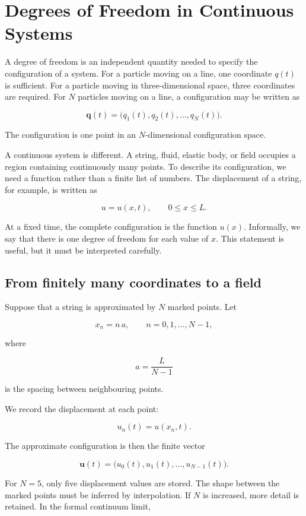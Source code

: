 \section{Degrees of Freedom in Continuous Systems}
\label{sec:continuous_degrees_of_freedom}

A degree of freedom is an independent quantity needed to specify the configuration of a system. For a particle moving on a line, one coordinate \(q(t)\) is sufficient. For a particle moving in three-dimensional space, three coordinates are required. For \(N\) particles moving on a line, a configuration may be written as

\[
\mathbf{q}(t)
=
\bigl(q_{1}(t),q_{2}(t),\ldots,q_{N}(t)\bigr).
\]

The configuration is one point in an \(N\)-dimensional configuration space.

A continuous system is different. A string, fluid, elastic body, or field occupies a region containing continuously many points. To describe its configuration, we need a function rather than a finite list of numbers. The displacement of a string, for example, is written as

\[
u=u(x,t),
\qquad 0\leq x\leq L.
\]

At a fixed time, the complete configuration is the function \(u(x)\). Informally, we say that there is one degree of freedom for each value of \(x\). This statement is useful, but it must be interpreted carefully.

\subsection{From finitely many coordinates to a field}

Suppose that a string is approximated by \(N\) marked points. Let

\[
x_{n}=n\,a,
\qquad n=0,1,\ldots,N-1,
\]

where

\[
a=\frac{L}{N-1}
\]

is the spacing between neighbouring points.

We record the displacement at each point:

\[
u_{n}(t)=u(x_{n},t).
\]

The approximate configuration is then the finite vector

\[
\mathbf{u}(t)
=
\bigl(u_{0}(t),u_{1}(t),\ldots,u_{N-1}(t)\bigr).
\]

For \(N=5\), only five displacement values are stored. The shape between the marked points must be inferred by interpolation. If \(N\) is increased, more detail is retained. In the formal continuum limit,

